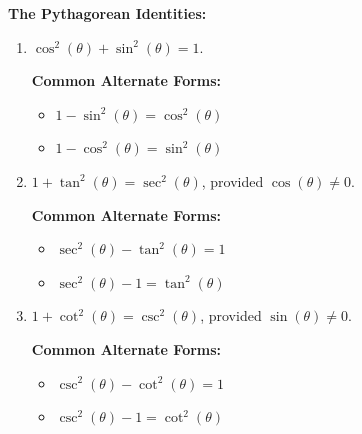 \smallskip

\colorbox{ResultColor}{\bbm

\begin{thm} \label{pythids}  \textbf{The Pythagorean Identities:} 

\begin{enumerate}

\item $\cos^{2}(\theta) + \sin^{2}(\theta) = 1$.

\textbf{Common Alternate Forms:}

\begin{itemize}

\item  $1 - \sin^{2}(\theta) = \cos^{2}(\theta)$

\item  $1 - \cos^{2}(\theta) = \sin^{2}(\theta)$

\end{itemize}

\item $1 + \tan^{2}(\theta) = \sec^{2}(\theta)$, provided $\cos(\theta) \neq 0$.

\textbf{Common Alternate Forms:}

\begin{itemize}

\item  $\sec^{2}(\theta) - \tan^{2}(\theta) = 1$

\item  $\sec^{2}(\theta) - 1 = \tan^{2}(\theta)$

\end{itemize}

\item $1 + \cot^{2}(\theta) = \csc^{2}(\theta)$, provided $\sin(\theta) \neq 0$.

\textbf{Common Alternate Forms:}

\begin{itemize}

\item  $\csc^{2}(\theta) - \cot^{2}(\theta) = 1$

\item  $\csc^{2}(\theta) - 1 = \cot^{2}(\theta)$

\end{itemize}

\end{enumerate}

\end{thm}

\ebm}

